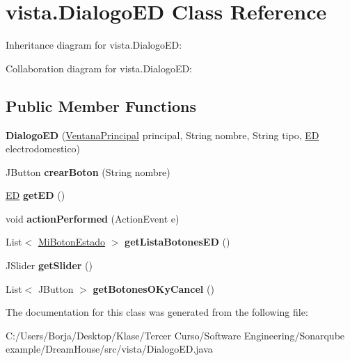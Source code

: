 \hypertarget{classvista_1_1_dialogo_e_d}{}\section{vista.\+Dialogo\+ED Class Reference}
\label{classvista_1_1_dialogo_e_d}


Inheritance diagram for vista.\+Dialogo\+ED\+:


Collaboration diagram for vista.\+Dialogo\+ED\+:
\subsection*{Public Member Functions}
\begin{DoxyCompactItemize}
\item 
\mbox{\label{classvista_1_1_dialogo_e_d_a7f7115005d0f3f72df01fdaee9edf904}} 
{\bfseries Dialogo\+ED} (\mbox{\hyperlink{classvista_1_1_ventana_principal}{Ventana\+Principal}} principal, String nombre, String tipo, \mbox{\hyperlink{classmodelo_1_1_e_d}{ED}} electrodomestico)
\item 
\mbox{\label{classvista_1_1_dialogo_e_d_a2cc67426758e03db893c7964c5dc3434}} 
J\+Button {\bfseries crear\+Boton} (String nombre)
\item 
\mbox{\label{classvista_1_1_dialogo_e_d_ae87e1a5324565d4fd21215a79cbc4249}} 
\mbox{\hyperlink{classmodelo_1_1_e_d}{ED}} {\bfseries get\+ED} ()
\item 
\mbox{\label{classvista_1_1_dialogo_e_d_a3c72cc5cb5d90ccf816f08fe502836a8}} 
void {\bfseries action\+Performed} (Action\+Event e)
\item 
\mbox{\label{classvista_1_1_dialogo_e_d_aaad8ad855421519227fe64f578dce276}} 
List$<$ \mbox{\hyperlink{classvista_1_1_mi_boton_estado}{Mi\+Boton\+Estado}} $>$ {\bfseries get\+Lista\+Botones\+ED} ()
\item 
\mbox{\label{classvista_1_1_dialogo_e_d_a396d4cbdeee607588ba53cd8ca19fbb0}} 
J\+Slider {\bfseries get\+Slider} ()
\item 
\mbox{\label{classvista_1_1_dialogo_e_d_ad56834c0f0dc975064069e162ea99196}} 
List$<$ J\+Button $>$ {\bfseries get\+Botones\+O\+Ky\+Cancel} ()
\end{DoxyCompactItemize}


The documentation for this class was generated from the following file\+:\begin{DoxyCompactItemize}
\item 
C\+:/\+Users/\+Borja/\+Desktop/\+Klase/\+Tercer Curso/\+Software Engineering/\+Sonarqube example/\+Dream\+House/src/vista/Dialogo\+E\+D.\+java\end{DoxyCompactItemize}
